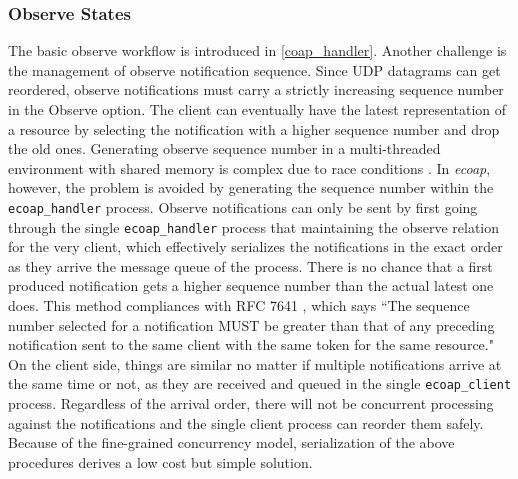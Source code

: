 \subsubsection{Observe States}

The basic observe workflow is introduced in \ref{coap_handler}. Another challenge is the management of observe notification sequence. Since UDP datagrams can get reordered, observe notifications must carry a strictly increasing sequence number in the Observe option. The client can eventually have the latest representation of a resource by selecting the notification with a higher sequence number and drop the old ones. Generating observe sequence number in a multi-threaded environment with shared memory is complex due to race conditions \cite{kovatsch2015scalable}. In \textit{ecoap}, however, the problem is avoided by generating the sequence number within the \verb|ecoap_handler| process. Observe notifications can only be sent by first going through the single \verb|ecoap_handler| process that maintaining the observe relation for the very client, which effectively serializes the notifications in the exact order as they arrive the message queue of the process. There is no chance that a first produced notification gets a higher sequence number than the actual latest one does. This method compliances with RFC 7641 \cite{coap_observe}, which says ``The sequence number selected for a notification MUST be greater than that of any preceding notification sent to the same client with the same token for the same resource." On the client side, things are similar no matter if multiple notifications arrive at the same time or not, as they are received and queued in the single \verb|ecoap_client| process. Regardless of the arrival order, there will not be concurrent processing against the notifications and the single client process can reorder them safely. Because of the fine-grained concurrency model, serialization of the above procedures derives a low cost but simple solution. 





